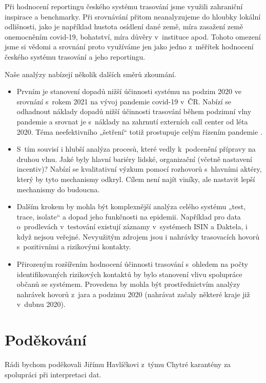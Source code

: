 Při hodnocení reportingu českého systému trasování jsme využili zahraniční inspirace a benchmarky. Při srovnávání přitom neanalyzujeme do hloubky lokální odlišnosti, jako je například hustota osídlení dané země, míra zasažení země onemocněním covid-19, bohatství, míra důvěry v~instituce apod. Tohoto omezení jsme si vědomi a srovnání proto využíváme jen jako jedno z~měřítek hodnocení českého systému trasování a jeho reportingu.

Naše analýzy nabízejí několik dalších směrů zkoumání.

\begin{itemize}
\item Prvním je stanovení dopadů nižší účinnosti systému na podzim 2020 ve srov\-ná\-ní s~rokem 2021 na vývoj pandemie covid-19 v~ČR. Nabízí se odhadnout náklady dopadů nižší účinnosti trasování během podzimní vlny pandemie a srovnat je s~náklady na zahrnutí externích call center od léta 2020. Téma neefektivního „šetření“ totiž prostupuje celým řízením pandemie \cite{tr_ProkopN, tr_Zidek}.
\item S~tím souvisí i hlubší analýza procesů, které vedly k~podcenění přípravy na druhou vlnu. Jaké byly hlavní bariéry lidské, organizační (včetně nastavení incentiv)? Nabízí se kvalitativní výzkum pomocí rozhovorů s~hlavními aktéry, který by tyto mechanismy odkryl. Cílem není najít viníky, ale nastavit lepší mechanismy do budoucna.
\item Dalším krokem by mohla být komplexnější analýza celého systému „test, trace, isolate“ a dopad jeho funkčnosti na epidemii. Například pro data o~prodlevách v~testování existují záznamy v~systémech ISIN a Daktela, i když nejsou veřejné. Nevyužitým zdrojem jsou i nahrávky trasovacích hovorů s~pozitivními a rizikovými kontakty.
\item Přirozeným rozšířením hodnocení účinnosti trasování s~ohledem na počty identifikovaných rizikových kontaktů by bylo stanovení vlivu spolupráce občanů se systémem. Provedena by mohla být prostřednictvím analýzy nahrávek hovorů z~jara a podzimu 2020 (nahrávat začaly některé kraje již v~dubnu 2020).
\end{itemize}

\section*{Poděkování}

Rádi bychom poděkovali Jiřímu Havlíčkovi z~týmu Chytré karantény za spolupráci při interpretaci dat.

